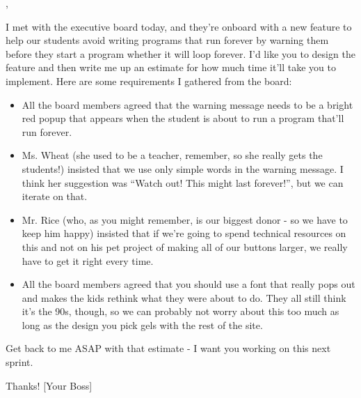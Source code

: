 \documentclass{report}
\newcommand*{\pts}[1]{\addtocounter{points}{#1}(#1pt)}
\begin{document}
\begin{spacing}{1.4}
\begin{enumerate},

    I met with the executive board today, and they're onboard with a new feature to help our students avoid
    writing programs that run forever by warning them before they start a program whether it will loop forever.
    I'd like you to design the feature and then write me up an estimate for how much time it'll take you to
    implement. Here are some requirements I gathered from the board:
    \begin{itemize}
    \item All the board members agreed that the warning message needs to be a bright red popup that appears
      when the student is about to run a program that'll run forever.
    \item Ms. Wheat (she used to be a teacher, remember, so she really gets the students!) insisted that we
      use only simple words in the warning message. I think her suggestion was ``Watch out! This might last forever!'', but
      we can iterate on that.
    \item Mr. Rice (who, as you might remember, is our biggest donor - so we have to keep him happy) insisted that
      if we're going to spend technical resources on this and not on his pet project of making all of our buttons larger,
      we really have to get it right every time.
    \item All the board members agreed that you should use a font that really pops out and makes the kids rethink what
      they were about to do. They all still think it's the 90s, though, so we can probably not worry about this too much
      as long as the design you pick gels with the rest of the site.
    \end{itemize}

    Get back to me ASAP with that estimate - I want you working on this next sprint.

    Thanks!
    [Your Boss]
    
    





\end{enumerate}
\end{spacing}
\end{document}
